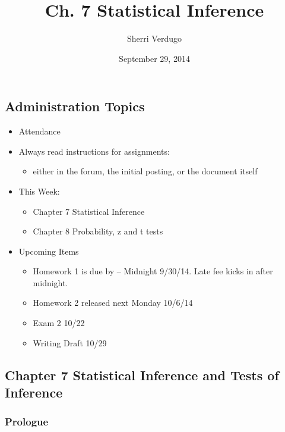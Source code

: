 \documentclass[]{article}
\title{Ch. 7 Statistical Inference}
\author{Sherri Verdugo}
\date{September 29, 2014}
\begin{document}
\maketitle


{
\hypersetup{linkcolor=black}
\setcounter{tocdepth}{3}
\tableofcontents
}
\subsection{Administration Topics}\label{administration-topics}

\begin{itemize}
\itemsep1pt\parskip0pt
\item
  Attendance
\item
  Always read instructions for assignments:

  \begin{itemize}
  \itemsep1pt\parskip0pt
  \item
    either in the forum, the initial posting, or the document itself
  \end{itemize}
\item
  This Week:

  \begin{itemize}
  \itemsep1pt\parskip0pt
  \item
    Chapter 7 Statistical Inference
  \item
    Chapter 8 Probability, z and t tests
  \end{itemize}
\item
  Upcoming Items

  \begin{itemize}
  \itemsep1pt\parskip0pt
  \item
    Homework 1 is due by -- Midnight 9/30/14. Late fee kicks in after
    midnight.
  \item
    Homework 2 released next Monday 10/6/14
  \item
    Exam 2 10/22
  \item
    Writing Draft 10/29
  \end{itemize}
\end{itemize}

\subsection{Chapter 7 Statistical Inference and Tests of
Inference}\label{chapter-7-statistical-inference-and-tests-of-inference}

\subsubsection{Prologue}\label{prologue}
\end{document}
